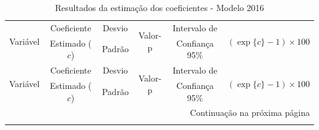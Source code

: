 \documentclass[12pt,a4paper,header]{abnt}
\begin{document}
\begin{center}
\small
\begin{longtable}{lccccc}
\caption{Resultados da estimação dos coeficientes - Modelo 2016}
\label{tab:resultados_2016} \\
\toprule
\multirow{2}{*}{Variável} & Coeficiente & Desvio & \multirow{2}{*}{Valor-p} & Intervalo de & \multirow{2}{*}{$(\exp\{c\}-1)\times 100$} \\
& Estimado ($c$) & Padrão & & Confiança 95\% & \\
\midrule
\endfirsthead

\toprule
\multirow{2}{*}{Variável} & Coeficiente & Desvio & \multirow{2}{*}{Valor-p} & Intervalo de & \multirow{2}{*}{$(\exp\{c\}-1)\times 100$} \\
& Estimado ($c$) & Padrão & & Confiança 95\% & \\
\midrule
\endhead

\midrule
\multicolumn{6}{r}{\small Continuação na próxima página} \\
\midrule
\endfoot

\bottomrule
\endlastfoot


\end{longtable}
\end{center}
\end{document}

